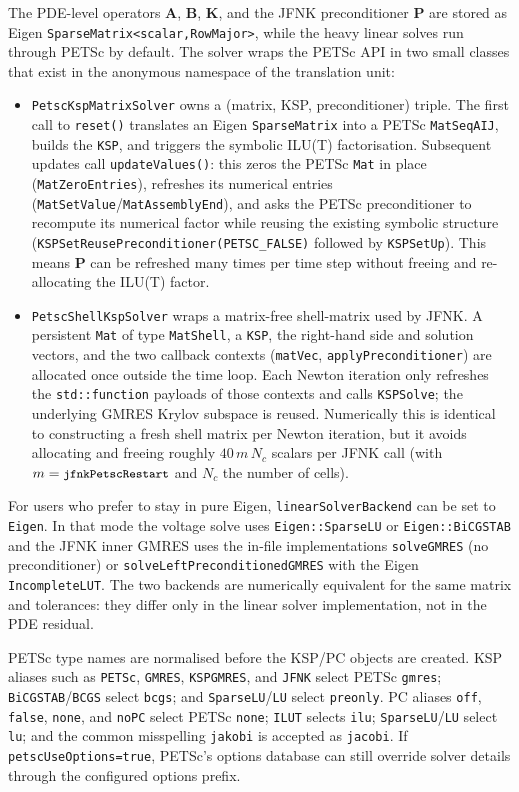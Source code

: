 \documentclass[11pt,a4paper]{article}
\newcommand{\code}[1]{\texttt{\small #1}}
\newcommand{\Kstif}{\mathbf{K}}
\newcommand{\Aimp}{\mathbf{A}}
\newcommand{\Bimp}{\mathbf{B}}
\begin{document}
The PDE-level operators $\Aimp$, $\Bimp$, $\Kstif$, and the JFNK preconditioner
$\mathbf{P}$ are stored as Eigen \code{SparseMatrix<scalar,RowMajor>}, while the
heavy linear solves run through PETSc by default. The solver wraps the PETSc
API in two small classes that exist in the anonymous namespace of the
translation unit:
\begin{itemize}
\item \code{PetscKspMatrixSolver} owns a (matrix, KSP, preconditioner)
triple. The first call to \code{reset()} translates an Eigen \code{SparseMatrix}
into a PETSc \code{MatSeqAIJ}, builds the \code{KSP}, and triggers the symbolic
ILU(T) factorisation. Subsequent updates call
\code{updateValues()}: this zeros the PETSc \code{Mat} in place
(\code{MatZeroEntries}), refreshes its numerical entries
(\code{MatSetValue}/\code{MatAssemblyEnd}), and asks the PETSc preconditioner to
recompute its numerical factor while reusing the existing symbolic structure
(\code{KSPSetReusePreconditioner(PETSC\_FALSE)} followed by
\code{KSPSetUp}). This means $\mathbf{P}$ can be refreshed many times per
time step without freeing and re-allocating the ILU(T) factor.
\item \code{PetscShellKspSolver} wraps a matrix-free shell-matrix used by
JFNK. A persistent \code{Mat} of type \code{MatShell}, a \code{KSP}, the
right-hand side and solution vectors, and the two callback contexts
(\code{matVec}, \code{applyPreconditioner}) are allocated once outside the time
loop. Each Newton iteration only refreshes the
\code{std::function} payloads of those contexts and calls \code{KSPSolve}; the
underlying GMRES Krylov subspace is reused. Numerically this is identical to
constructing a fresh shell matrix per Newton iteration, but it avoids
allocating and freeing roughly $40\,m\,N_c$ scalars per JFNK call (with
$m=\code{jfnkPetscRestart}$ and $N_c$ the number of cells).
\end{itemize}
For users who prefer to stay in pure Eigen, \code{linearSolverBackend} can be
set to \code{Eigen}. In that mode the voltage solve uses
\code{Eigen::SparseLU} or \code{Eigen::BiCGSTAB} and the JFNK inner GMRES uses
the in-file implementations \code{solveGMRES} (no preconditioner) or
\code{solveLeftPreconditionedGMRES} with the Eigen \code{IncompleteLUT}.
The two backends are numerically equivalent for the same matrix and tolerances:
they differ only in the linear solver implementation, not in the PDE residual.

PETSc type names are normalised before the KSP/PC objects are created. KSP
aliases such as \code{PETSc}, \code{GMRES}, \code{KSPGMRES}, and \code{JFNK}
select PETSc \code{gmres}; \code{BiCGSTAB}/\code{BCGS} select \code{bcgs}; and
\code{SparseLU}/\code{LU} select \code{preonly}. PC aliases
\code{off}, \code{false}, \code{none}, and \code{noPC} select PETSc
\code{none}; \code{ILUT} selects \code{ilu}; \code{SparseLU}/\code{LU} select
\code{lu}; and the common misspelling \code{jakobi} is accepted as
\code{jacobi}. If \code{petscUseOptions=true}, PETSc's options database can
still override solver details through the configured options prefix.
\end{document}
